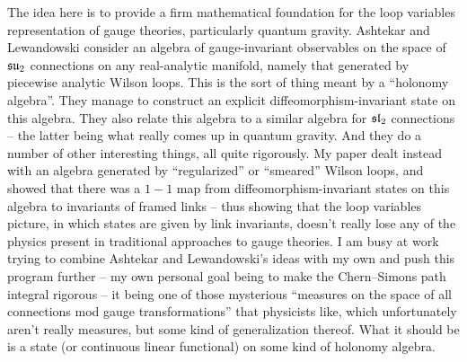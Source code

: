 The idea here is to provide a firm mathematical foundation for the loop variables representation of gauge theories, particularly quantum gravity.  Ashtekar and Lewandowski consider an algebra of gauge-invariant observables on the space of $\mathfrak{su}_2$ connections on any real-analytic manifold, namely that generated by piecewise analytic Wilson loops.  This is the sort of thing meant by a ``holonomy algebra''. They manage to construct an explicit diffeomorphism-invariant state on this algebra.  They also relate this algebra to a similar algebra for $\mathfrak{sl}_2$ connections -- the latter being what really comes up in quantum gravity.  And they do a number of other interesting things, all quite rigorously.  My paper dealt instead with an algebra generated by ``regularized'' or ``smeared'' Wilson loops, and showed that there was a $1-1$ map from diffeomorphism-invariant states on this algebra to invariants of framed links -- thus showing that the loop variables picture, in which states are given by link invariants, doesn't really lose any of the physics present in traditional approaches to gauge theories.  I am busy at work trying to combine Ashtekar and Lewandowski's ideas with my own and push this program further -- my own personal goal being to make the Chern--Simons path integral rigorous -- it being one of those mysterious ``measures on the space of all connections mod gauge transformations'' that physicists like, which unfortunately aren't really measures, but some kind of generalization thereof.  What it should be is a state (or continuous linear functional) on some kind of holonomy algebra. 
